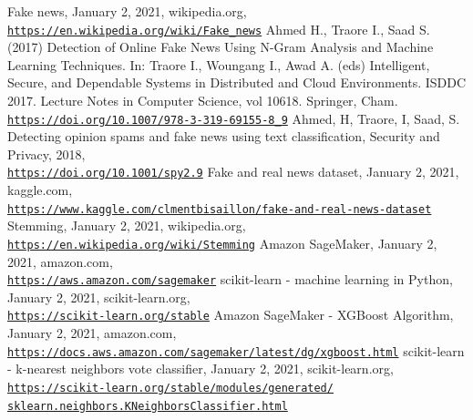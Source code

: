 \documentclass[a4paper,12pt,nottoc]{article}
\begin{document}
\clearpage
\begin{thebibliography}{9}
 Fake news, January 2, 2021, wikipedia.org, \\\href{https://en.wikipedia.org/wiki/Fake_news}{\texttt{https://en.wikipedia.org/wiki/Fake\_news}}
 Ahmed H., Traore I., Saad S. (2017) Detection of Online Fake News Using N-Gram Analysis and Machine Learning Techniques. In: Traore I., Woungang I., Awad A. (eds) Intelligent, Secure, and Dependable Systems in Distributed and Cloud Environments. ISDDC 2017. Lecture Notes in Computer Science, vol 10618. Springer, Cham. \\\href{https://doi.org/10.1007/978-3-319-69155-8_9}{\texttt{https://doi.org/10.1007/978-3-319-69155-8\_9}}
 Ahmed, H, Traore, I, Saad, S. Detecting opinion spams and fake news using text classification, Security and Privacy, 2018, \\\href{https://doi.org/10.1001/spy2.9}{\texttt{https://doi.org/10.1001/spy2.9}}
 Fake and real news dataset, January 2, 2021, kaggle.com, \\\href{https://www.kaggle.com/clmentbisaillon/fake-and-real-news-dataset}{\texttt{https://www.kaggle.com/clmentbisaillon/fake-and-real-news-dataset}}
 Stemming, January 2, 2021, wikipedia.org, \\\href{https://en.wikipedia.org/wiki/Stemming}{\texttt{https://en.wikipedia.org/wiki/Stemming}}
 Amazon SageMaker, January 2, 2021, amazon.com, \\\href{https://aws.amazon.com/sagemaker}{\texttt{https://aws.amazon.com/sagemaker}}
 scikit-learn - machine learning in Python, January 2, 2021, scikit-learn.org, \\\href{https://scikit-learn.org/stable}{\texttt{https://scikit-learn.org/stable}}
 Amazon SageMaker - XGBoost Algorithm, January 2, 2021, amazon.com, \\\href{https://docs.aws.amazon.com/sagemaker/latest/dg/xgboost.html}{\texttt{https://docs.aws.amazon.com/sagemaker/latest/dg/xgboost.html}}
 scikit-learn - k-nearest neighbors vote classifier, January 2, 2021, scikit-learn.org, \\\href{https://scikit-learn.org/stable/modules/generated/sklearn.neighbors.KNeighborsClassifier.html}{\texttt{https://scikit-learn.org/stable/modules/generated/\\sklearn.neighbors.KNeighborsClassifier.html}}

\end{thebibliography}
\end{document}

